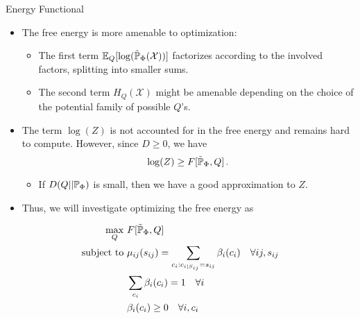 \begin{frame}{Energy Functional}
    \begin{itemize}
    \item The free energy is more amenable to optimization:
    \begin{itemize}
\pause
        \item The first term $\E_Q[\log(\tilde{\Pb}_{\Phi}(\mathcal{X}))]$ factorizes according to the involved factors, splitting into smaller sums.
\pause
        \item The second term $H_Q(\mathcal{X})$ might be amenable depending on the choice of the potential family of possible $Q$'s.
    \end{itemize}
\pause
    \item The term $\log(Z)$ is not accounted for in the free energy and remains hard to compute. However, since $D \geq 0$, we have
    \begin{equation}
        \log(Z) \geq F[\tilde{\Pb}_{\Phi},Q]\,.
    \end{equation}
\pause
    \begin{itemize}
        \item If $D(Q || \Pb_{\Phi})$ is small, then we have a good approximation to $Z$.
    \end{itemize}
\pause
    \item Thus, we will investigate optimizing the free energy as
    \end{itemize}
    \begin{equation}
        \label{eq:free-energy-optimization}
    \begin{aligned}
        \max_Q\ & F[\tilde{\Pb}_{\Phi},Q] \\
        \text{subject to } & \mu_{ij}(s_{ij}) = \sum_{c_i: c_{i|S_{ij}} = s_{ij}} \beta_i(c_i) \quad \forall ij, s_{ij} \\
        & \sum_{c_i} \beta_i(c_i) = 1 \quad \forall i\\
        & \beta_i(c_i) \geq 0 \quad \forall i, c_i \\
    \end{aligned}
    \end{equation}
\end{frame}


